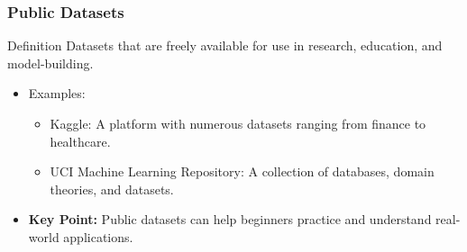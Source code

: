 \documentclass[aspectratio=169]{beamer}
\begin{document}
\begin{frame}[fragile]
    \frametitle{Public Datasets}
    \begin{block}{Definition}
        Datasets that are freely available for use in research, education, and model-building.
    \end{block}
    \begin{itemize}
        \item Examples:
            \begin{itemize}
                \item Kaggle: A platform with numerous datasets ranging from finance to healthcare.
                \item UCI Machine Learning Repository: A collection of databases, domain theories, and datasets.
            \end{itemize}
        \item \textbf{Key Point:} Public datasets can help beginners practice and understand real-world applications.
    \end{itemize}
\end{frame}
\end{document}
